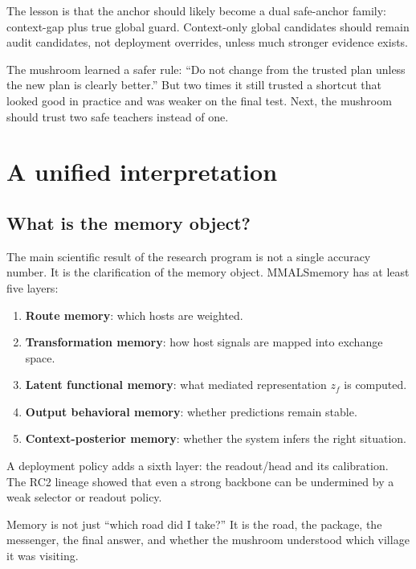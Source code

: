 \documentclass[11pt]{article}
\newcommand{\mmals}{\textsc{MMALS}}
\newcommand{\zf}{z_f}
\begin{document}
The lesson is that the anchor should likely become a dual safe-anchor family: context-gap plus true global guard. Context-only global candidates should remain audit candidates, not deployment overrides, unless much stronger evidence exists.

\begin{kidbox}
The mushroom learned a safer rule: ``Do not change from the trusted plan unless the new plan is clearly better.'' But two times it still trusted a shortcut that looked good in practice and was weaker on the final test. Next, the mushroom should trust two safe teachers instead of one.
\end{kidbox}

\section{A unified interpretation}

\subsection{What is the memory object?}

The main scientific result of the research program is not a single accuracy number. It is the clarification of the memory object. \mmals memory has at least five layers:
\begin{enumerate}[leftmargin=*]
  \item \textbf{Route memory}: which hosts are weighted.
  \item \textbf{Transformation memory}: how host signals are mapped into exchange space.
  \item \textbf{Latent functional memory}: what mediated representation $\zf$ is computed.
  \item \textbf{Output behavioral memory}: whether predictions remain stable.
  \item \textbf{Context-posterior memory}: whether the system infers the right situation.
\end{enumerate}

A deployment policy adds a sixth layer: the readout/head and its calibration. The RC2 lineage showed that even a strong backbone can be undermined by a weak selector or readout policy.

\begin{kidbox}
Memory is not just ``which road did I take?'' It is the road, the package, the messenger, the final answer, and whether the mushroom understood which village it was visiting.
\end{kidbox}
\end{document}
